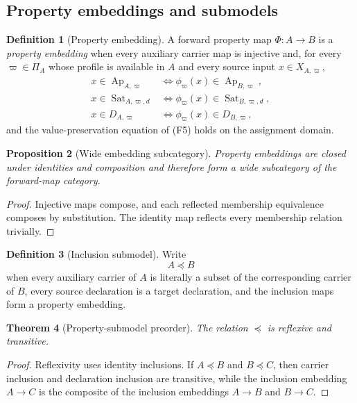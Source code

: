 \documentclass[11pt]{article}
\newcommand{\Ap}{\operatorname{Ap}}
\newcommand{\Sat}{\operatorname{Sat}}
\newtheorem{theorem}{Theorem}[section]
\newtheorem{proposition}[theorem]{Proposition}
\theoremstyle{definition}
\newtheorem{definition}[theorem]{Definition}
\theoremstyle{remark}
\begin{document}
\subsection{Property embeddings and submodels}

\begin{definition}[Property embedding]
A forward property map \(\Phi:A\to B\) is a \emph{property embedding} when every auxiliary carrier map is injective and, for every \(\varpi\in\Pi_A\) whose profile is available in \(A\) and every source input \(x\in X_{A,\varpi}\),
\[
\begin{aligned}
x\in\Ap_{A,\varpi}
&\Longleftrightarrow
\phi_{\varpi}(x)\in\Ap_{B,\varpi},\\
x\in\Sat_{A,\varpi,d}
&\Longleftrightarrow
\phi_{\varpi}(x)\in\Sat_{B,\varpi,d},\\
x\in D_{A,\varpi}
&\Longleftrightarrow
\phi_{\varpi}(x)\in D_{B,\varpi},
\end{aligned}
\]
and the value-preservation equation of (F5) holds on the assignment domain.
\end{definition}

\begin{proposition}[Wide embedding subcategory]
Property embeddings are closed under identities and composition and therefore form a wide subcategory of the forward-map category.
\end{proposition}

\begin{proof}
Injective maps compose, and each reflected membership equivalence composes by substitution.
The identity map reflects every membership relation trivially.
\end{proof}

\begin{definition}[Inclusion submodel]
Write
\[
A\preccurlyeq B
\]
when every auxiliary carrier of \(A\) is literally a subset of the corresponding carrier of \(B\), every source declaration is a target declaration, and the inclusion maps form a property embedding.
\end{definition}

\begin{theorem}[Property-submodel preorder]
The relation \(\preccurlyeq\) is reflexive and transitive.
\end{theorem}

\begin{proof}
Reflexivity uses identity inclusions.
If \(A\preccurlyeq B\) and \(B\preccurlyeq C\), then carrier inclusion and declaration inclusion are transitive, while the inclusion embedding \(A\to C\) is the composite of the inclusion embeddings \(A\to B\) and \(B\to C\).
\end{proof}
\end{document}
